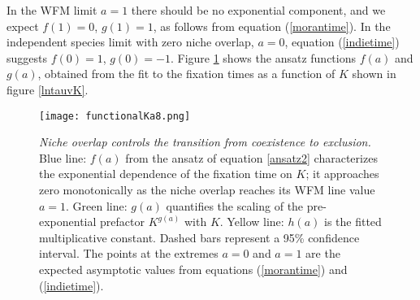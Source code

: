 \documentclass[a4paper,10pt]{article}
\numberwithin{equation}{section} %
\begin{document}
In the  WFM limit $a=1$ there should be no exponential component, and we expect $f(1)=0$, $g(1)=1$, as follows from equation (\ref{morantime}). %
In the independent species limit with zero niche overlap, $a=0$, equation (\ref{indietime}) suggests $f(0)=1$, $g(0)=-1$. %
Figure \ref{functionalKa} shows the ansatz functions $f(a)$ and $g(a)$, obtained  from the fit to the fixation times as a function of $K$ shown in figure \ref{lntauvK}.

\begin{figure}[ht]
\centering %
\texttt{[image: functionalKa8.png]} %
\caption{\emph{Niche overlap controls the transition from coexistence to exclusion.}  Blue line: $f(a)$ from the ansatz of equation \ref{ansatz2} characterizes the exponential dependence of the fixation time on $K$; it  approaches zero monotonically as the niche overlap reaches its WFM line value $a=1$. Green line: $g(a)$ quantifies the scaling of the pre-exponential prefactor $K^{g(a)}$ with $K$. Yellow line: $h(a)$ is the fitted multiplicative constant. Dashed bars represent a 95\% confidence interval. The points at the extremes $a=0$ and $a=1$ are the expected asymptotic values from equations (\ref{morantime}) and (\ref{indietime}). } \label{functionalKa}
\end{figure}%
\end{document}
